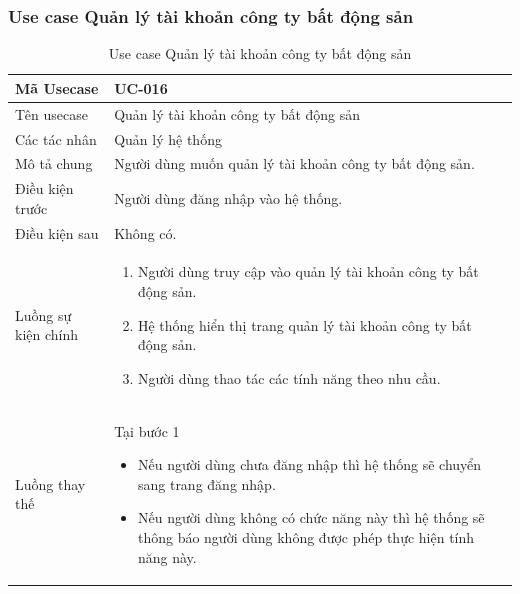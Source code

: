 \documentclass[12pt,a4paper]{article}
\begin{document}
    \subsubsection*{Use case Quản lý tài khoản công ty bất động sản}
    \begin{table}[H]
        \centering
        \begin{tabular}{|p{3.5cm}|p{11.5cm}|c|}
            \hline
            Mã Usecase      & UC-016                                                  \\
            \hline
            Tên usecase     & Quản lý tài khoản công ty bất động sản                  \\
            \hline
            Các tác nhân    & Quản lý hệ thống                                        \\
            \hline
            Mô tả chung     & Người dùng muốn quản lý tài khoản công ty bất động sản. \\
            \hline

            Điều kiện trước & Người dùng đăng nhập vào hệ thống.                      \\
            \hline

            Điều kiện sau   & Không có.                                               \\
            \hline

            Luồng sự kiện chính & \vspace{-.8cm}\begin{enumerate}
                                                    \item Người dùng truy cập vào quản lý tài khoản công ty bất động sản.
                                                    \item Hệ thống hiển thị trang quản lý tài khoản công ty bất động sản.
                                                    \item Người dùng thao tác các tính năng theo nhu cầu.
            \end{enumerate}
            \\
            \hline
            Luồng thay thế & Tại bước 1\newline
            \vspace{-.8cm}\begin{itemize}
                              \item Nếu người dùng chưa đăng nhập thì hệ thống sẽ chuyển sang trang đăng nhập.
                              \item Nếu người dùng không có chức năng này thì hệ thống sẽ thông báo người dùng không được phép thực hiện tính năng này.
            \end{itemize}

            \\ \hline
        \end{tabular}
        \caption{Use case Quản lý tài khoản công ty bất động sản}

    \end{table}
\end{document}
